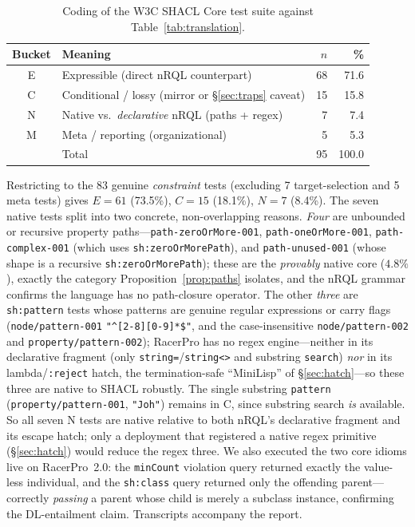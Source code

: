 \documentclass[11pt,letterpaper]{article}
\theoremstyle{definition}
\newcommand{\nrql}{nRQL}
\newcommand{\racer}{RacerPro}
\newcommand{\shacl}{SHACL}
\begin{document}
\begin{table}[ht]
\centering
\begin{tabular}{clrr}
\toprule
Bucket & Meaning & $n$ & \% \\
\midrule
E & Expressible (direct \nrql{} counterpart) & 68 & 71.6 \\
C & Conditional / lossy (mirror or \S\ref{sec:traps} caveat) & 15 & 15.8 \\
N & Native vs.\ \emph{declarative} \nrql{} (paths + regex) & 7 & 7.4 \\
M & Meta / reporting (organizational) & 5 & 5.3 \\
\midrule
& Total & 95 & 100.0 \\
\bottomrule
\end{tabular}
\caption{Coding of the W3C \shacl{} Core test suite against Table~\ref{tab:translation}.}\label{tab:empirical}
\end{table}

Restricting to the 83 genuine \emph{constraint} tests (excluding 7 target-selection and 5 meta tests) gives $E=61$ (73.5\%), $C=15$ (18.1\%), $N=7$ (8.4\%). The seven native tests split into two concrete, non-overlapping reasons. \emph{Four} are unbounded or recursive property paths---\texttt{path-zeroOrMore-001}, \texttt{path-oneOrMore-001}, \texttt{path-complex-001} (which uses \texttt{sh:zeroOrMorePath}), and \texttt{path-unused-001} (whose shape is a recursive \texttt{sh:zeroOrMorePath}); these are the \emph{provably} native core ($4.8\%$), exactly the category Proposition~\ref{prop:paths} isolates, and the \nrql{} grammar confirms the language has no path-closure operator. The other \emph{three} are \texttt{sh:pattern} tests whose patterns are genuine regular expressions or carry flags (\texttt{node/pattern-001} \texttt{"\^{}[2-8][0-9]*\$"}, and the case-insensitive \texttt{node/pattern-002} and \texttt{property/pattern-002}); RacerPro has no regex engine---neither in its declarative fragment (only \texttt{string=}/\texttt{string<>} and substring \texttt{search}) \emph{nor} in its lambda/\texttt{:reject} hatch, the termination-safe ``MiniLisp'' of \S\ref{sec:hatch}---so these three are native to \shacl{} robustly. The single substring \texttt{pattern} (\texttt{property/pattern-001}, \texttt{"Joh"}) remains in C, since substring search \emph{is} available. So all seven N tests are native relative to both \nrql{}'s declarative fragment and its escape hatch; only a deployment that registered a native regex primitive (\S\ref{sec:hatch}) would reduce the regex three. We also executed the two core idioms live on \racer{}~2.0: the \texttt{minCount} violation query returned exactly the value-less individual, and the \texttt{sh:class} query returned only the offending parent---correctly \emph{passing} a parent whose child is merely a subclass instance, confirming the DL-entailment claim. Transcripts accompany the report.
\end{document}
